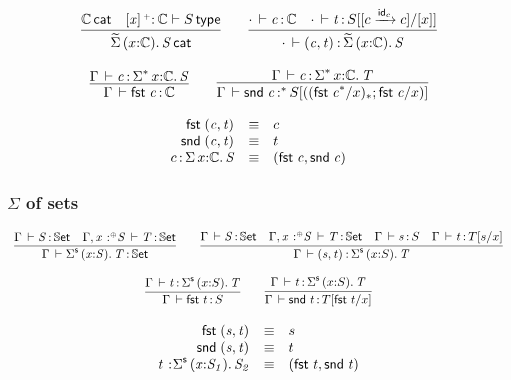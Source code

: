 \documentclass[11pt]{article}
\theoremstyle{plain}
\begin{document}
\[
\begin{array}{c}
\infer{\wfdtp{\sigmatwcat{x}{\C}{S}}}
      {\wfdtp{\C} &
        \wftp{\twcatvar{x}{\co}{\C}}{S}}
\qquad
\infer{\ofdtp{\cdot}{\pair{c}{t}}{\sigmatwcat x \C S}}
      {\ofdtp{\cdot}{c}{\C} &
       \oftp{\cdot}{t}{S[\substtw{c}{c}{\idm c}{x}]}}
\\ \\
\infer{\ofdtp{\Gamma}{\fst c}{\C}}
      {\ofdtp{\Gamma}{c}{\sigmacatstar{\vcond}{x}{\C}{S}}}
\qquad
\infer{\oftpe{\Gamma}{\snd c}{\vcond}{\tsubst{S}{\substdup{(\fst c^\vcond / x)}{\vcond}{\fst c/x}}}}
      {\ofdtp{\Gamma}{c}{\sigmacatstar{\vcond}{x}{\C}{T}}}
\end{array}
\]

\[
\begin{array}{rcll}
\mathit{\mathsf{fst}_{} \: \mathit{(c,t)_{}}} & \equiv & c \\
\mathit{\mathsf{snd}_{} \: \mathit{(c,t)_{}}} & \equiv & t \\
c \, \mathit{:} \, \textnormal{$\Sigma$}\,x \mathit{:} \mathbb{C}.\,\mathit{S} & \equiv & \mathit{(\mathit{\mathsf{fst}_{} \: c},\mathit{\mathsf{snd}_{} \: c})_{}}
\end{array}
\]

\subsubsection{$\Sigma$ of sets}

\[
\begin{array}{c}
\infer{\ofdtp{\Gamma}{\sigmaset{x}{S}{T}}{\types}}
      {\ofdtp{\Gamma}{S}{\types} &
        \ofdtp{\Gamma, \tpvar{x}{\coc}{S}}{T}{\types}}
\qquad
\infer{\oftp{\Gamma}{\pair{s}{t}}{\sigmaset x {S} {T}}}
      {\ofdtp{\Gamma}{S}{\types} &
        \ofdtp{\Gamma, \tpvar{x}{\coc}{S}}{T}{\types} &
        \oftp{\Gamma}{s}{S} &
        \oftp{\Gamma}{t}{\subst{T}{s}{x}}}
\\ \\
\infer{\oftp{\Gamma}{\fst t}{S}}
      {\oftp{\Gamma}{t}{\sigmaset{x}{S}{T}}}
\qquad
\infer{\oftp{\Gamma}{\snd t}{\subst{T}{\fst t}{x}}}
      {\oftp{\Gamma}{t}{\sigmaset{x}{S}{T}}}
\end{array}
\]

\[
\begin{array}{rcll}
\mathit{\mathsf{fst}_{} \: \mathit{(s,t)_{}}} & \equiv & s \\
\mathit{\mathsf{snd}_{} \: \mathit{(s,t)_{}}} & \equiv & t \\
\mathit{t} \,^{\,}{:}^{} \mathit{\textnormal{$\Sigma$}^{\mathsf{s}}\,(x \mathit{:} S_1).\,\mathit{S_2}} & \equiv & \mathit{(\mathit{\mathsf{fst}_{} \: t},\mathit{\mathsf{snd}_{} \: t})_{}}
\end{array}
\]
\end{document}
